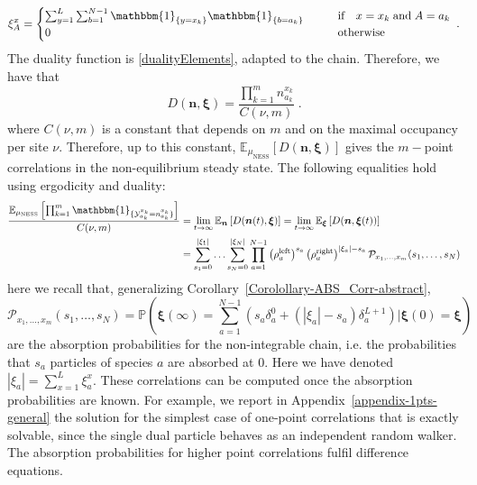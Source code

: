 \documentclass[10pt]{article}
\numberwithin{equation}{section}
\numberwithin{equation}{subsection}
\newcommand{\dt}{\;.}
\begin{document}
{\begin{equation}
	\xi_{A}^{x}=	\begin{cases}
	\sum_{y=1}^{L}\sum_{b=1}^{N-1}\mathbbm{1}_{\{y=x_{k}\}}\mathbbm{1}_{\{b=a_{k}\}}\qquad &\text{if}\quad x=x_{k}\;\text{and} \; A=a_{k}\\
		 0\qquad &\text{otherwise}
	\end{cases}\dt
\end{equation}
The duality function is \eqref{dualityElements}, adapted to the chain. Therefore, we have that
\begin{equation}
	D(\bm{n},\bm{\xi})= \frac{\prod_{k=1}^{m}n_{a_{k}}^{x_{k}}}{C(\nu,m)}\dt
\end{equation}
where $C(\nu,m)$ is a constant that depends on $m$ and {\color{black} on the maximal occupancy} per site $\nu$. 
Therefore, up to this constant, $\mathbb{E}_{\mu_{\text{NESS}}}\left[D(\bm{n},\bm{\xi})\right]$ gives the $m-$point correlations in the non-equilibrium steady state. The following equalities hold using ergodicity and duality:
\begin{equation}\label{ExptationSS}
	\begin{split}
		\frac{\mathbb{E}_{\mu_{\text{NESS}}}\left[\prod_{k=1}^{m}\mathbbm{1}_{\{\mathcal{Y}_{a_{k}}^{x_{k}}=n_{a_{k}}^{x_{k}}\}}\right]}{C(\nu,m)}&=\lim_{t\to\infty}\mathbb{E}_{\bm{n}}\left[D(\bm{n}(t),\bm{\xi})\right]=\lim_{t\to\infty}\mathbb{E}_{\bm{\xi}}\left[D(\bm{n},\bm{\xi}(t))\right]
		\\&=
		\sum_{s_{1}=0}^{|\xi_{1}|}\ldots\sum_{s_{N}=0}^{|\xi_{N}|}\prod_{a=1}^{N-1}\left(\rho_{a}^{\text{left}}\right)^{s_{a}}\left(\rho_{a}^{\text{right}}\right)^{|\xi_{a}|-s_{a}}\mathcal{P}_{x_{1},\ldots,x_{m}}(s_{1},\ldots,s_{N})
	\end{split}
\end{equation}
here we recall that, generalizing Corollary~\ref{Corolollary-ABS_Corr-abstract},
\begin{equation}\label{Pass} 
	\mathcal{P}_{x_{1},\ldots,x_{m}}(s_{1},\ldots,s_{N})	=\mathbb{P}\left(\bm{\xi}(\infty)=\sum_{a=1}^{N-1}\left(s_{a}\delta_{a}^{0}+(|\xi_{a}|-s_{a})\delta_{a}^{L+1}\right)\Big|  \bm{\xi}(0)=\bm{\xi}\right)
\end{equation}
are the absorption probabilities for the non-integrable chain, i.e. the probabilities that $s_{a}$ particles of species $a$ are absorbed at $0$. Here we have denoted $|\xi_{a}|=\sum_{x=1}^{L}\xi_{a}^{x}$.
 These correlations can be computed once the absorption probabilities are known. For example, we report in Appendix~\ref{appendix-1pts-general} the solution for the simplest case of one-point correlations that is exactly solvable, since the single dual particle behaves as an independent random walker. 
 The absorption probabilities for higher point correlations fulfil  difference equations.



}
\end{document}
